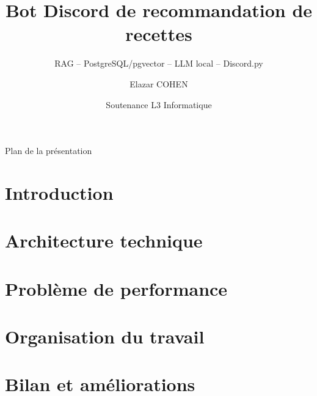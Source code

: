 \documentclass[aspectratio=169]{beamer}
\title{\textbf{Bot Discord de recommandation de recettes}}
\subtitle{RAG -- PostgreSQL/pgvector -- LLM local -- Discord.py}
\author{Elazar COHEN}
\date{Soutenance L3 Informatique}
\begin{document}
\begin{frame}
\titlepage
\end{frame}

\begin{frame}{Plan de la pr\'esentation}
\tableofcontents
\end{frame}

\section{Introduction}
\section{Architecture technique}
\section{Probl\`eme de performance}
\section{Organisation du travail}
\section{Bilan et am\'eliorations}

\end{document}
